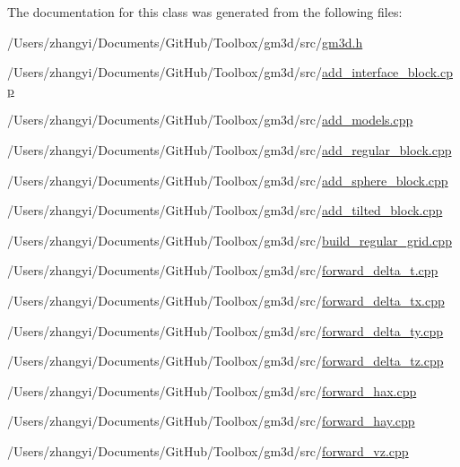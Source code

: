 The documentation for this class was generated from the following files\+:\begin{DoxyCompactItemize}
\item 
/\+Users/zhangyi/\+Documents/\+Git\+Hub/\+Toolbox/gm3d/src/\mbox{\hyperlink{gm3d_8h}{gm3d.\+h}}\item 
/\+Users/zhangyi/\+Documents/\+Git\+Hub/\+Toolbox/gm3d/src/\mbox{\hyperlink{add__interface__block_8cpp}{add\+\_\+interface\+\_\+block.\+cpp}}\item 
/\+Users/zhangyi/\+Documents/\+Git\+Hub/\+Toolbox/gm3d/src/\mbox{\hyperlink{add__models_8cpp}{add\+\_\+models.\+cpp}}\item 
/\+Users/zhangyi/\+Documents/\+Git\+Hub/\+Toolbox/gm3d/src/\mbox{\hyperlink{add__regular__block_8cpp}{add\+\_\+regular\+\_\+block.\+cpp}}\item 
/\+Users/zhangyi/\+Documents/\+Git\+Hub/\+Toolbox/gm3d/src/\mbox{\hyperlink{add__sphere__block_8cpp}{add\+\_\+sphere\+\_\+block.\+cpp}}\item 
/\+Users/zhangyi/\+Documents/\+Git\+Hub/\+Toolbox/gm3d/src/\mbox{\hyperlink{add__tilted__block_8cpp}{add\+\_\+tilted\+\_\+block.\+cpp}}\item 
/\+Users/zhangyi/\+Documents/\+Git\+Hub/\+Toolbox/gm3d/src/\mbox{\hyperlink{build__regular__grid_8cpp}{build\+\_\+regular\+\_\+grid.\+cpp}}\item 
/\+Users/zhangyi/\+Documents/\+Git\+Hub/\+Toolbox/gm3d/src/\mbox{\hyperlink{forward__delta__t_8cpp}{forward\+\_\+delta\+\_\+t.\+cpp}}\item 
/\+Users/zhangyi/\+Documents/\+Git\+Hub/\+Toolbox/gm3d/src/\mbox{\hyperlink{forward__delta__tx_8cpp}{forward\+\_\+delta\+\_\+tx.\+cpp}}\item 
/\+Users/zhangyi/\+Documents/\+Git\+Hub/\+Toolbox/gm3d/src/\mbox{\hyperlink{forward__delta__ty_8cpp}{forward\+\_\+delta\+\_\+ty.\+cpp}}\item 
/\+Users/zhangyi/\+Documents/\+Git\+Hub/\+Toolbox/gm3d/src/\mbox{\hyperlink{forward__delta__tz_8cpp}{forward\+\_\+delta\+\_\+tz.\+cpp}}\item 
/\+Users/zhangyi/\+Documents/\+Git\+Hub/\+Toolbox/gm3d/src/\mbox{\hyperlink{forward__hax_8cpp}{forward\+\_\+hax.\+cpp}}\item 
/\+Users/zhangyi/\+Documents/\+Git\+Hub/\+Toolbox/gm3d/src/\mbox{\hyperlink{forward__hay_8cpp}{forward\+\_\+hay.\+cpp}}\item 
/\+Users/zhangyi/\+Documents/\+Git\+Hub/\+Toolbox/gm3d/src/\mbox{\hyperlink{forward__vz_8cpp}{forward\+\_\+vz.\+cpp}}\item 

\end{DoxyCompactItemize}
